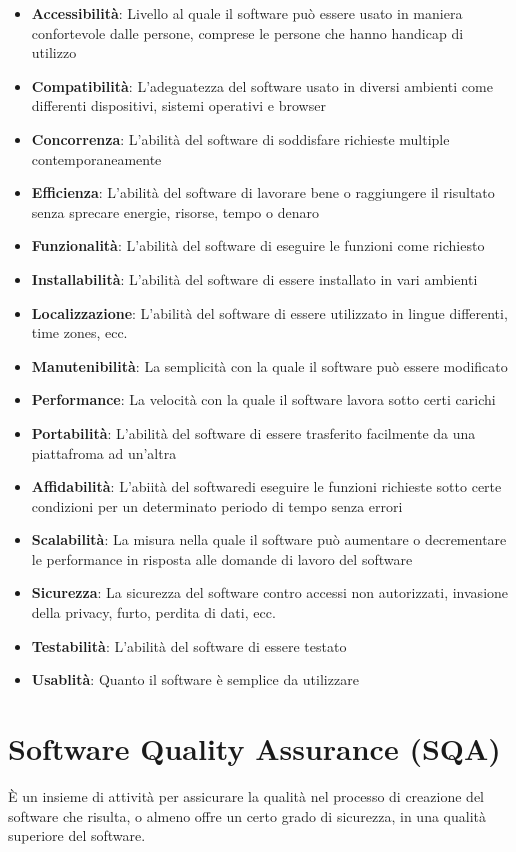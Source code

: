 \documentclass[11pt,a4paper]{book}
\begin{document}
\begin{itemize}
	\item \textbf{Accessibilità}: Livello al quale il software può essere usato in maniera confortevole dalle persone, comprese le persone che hanno handicap di utilizzo
	\item \textbf{Compatibilità}: L'adeguatezza del software usato in diversi ambienti come differenti dispositivi, sistemi operativi e browser
	\item \textbf{Concorrenza}: L'abilità del software di soddisfare richieste multiple contemporaneamente
	\item \textbf{Efficienza}: L'abilità del software di lavorare bene o raggiungere il risultato senza sprecare energie, risorse, tempo o denaro
	\item \textbf{Funzionalità}: L'abilità del software di eseguire le funzioni come richiesto
	\item \textbf{Installabilità}: L'abilità del software di essere installato in vari ambienti
	\item \textbf{Localizzazione}: L'abilità del software di essere utilizzato in lingue differenti, time zones, ecc.
	\item \textbf{Manutenibilità}: La semplicità con la quale il software può essere modificato
	\item \textbf{Performance}: La velocità con la quale il software lavora sotto certi carichi
	\item \textbf{Portabilità}: L'abilità del software di essere trasferito facilmente da una piattafroma ad un'altra
	\item \textbf{Affidabilità}: L'abiità del softwaredi eseguire le funzioni richieste sotto certe condizioni per un determinato periodo di tempo senza errori
	\item \textbf{Scalabilità}: La misura nella quale il software può aumentare o decrementare le performance in risposta alle domande di lavoro del software
	\item \textbf{Sicurezza}: La sicurezza del software contro accessi non autorizzati, invasione della privacy, furto, perdita di dati, ecc.
	\item \textbf{Testabilità}: L'abilità del software di essere testato
	\item \textbf{Usablità}: Quanto il software è semplice da utilizzare
\end{itemize}

\section{Software Quality Assurance (SQA)}
È un insieme di attività per assicurare la qualità nel processo di creazione del software che risulta, o almeno offre un certo grado di sicurezza, in una qualità superiore del software.
\end{document}
